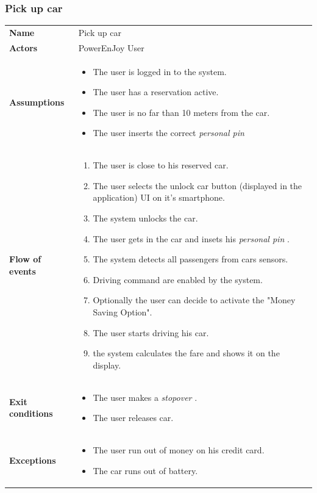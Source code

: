 \documentclass[english]{article}
\newcommand{\stopover}{\textit{stopover }}
\newcommand{\personalpin}{\textit{personal pin }}
\begin{document}
	\subsubsection{Pick up car}
	\begin{center}
	\begin{tabular}{l||p{10cm}}
	\textbf{Name} 
		& Pick up car\\ [8px]
	\textbf{Actors} 
		& PowerEnJoy User\\ [8px]
	\textbf{Assumptions} 
	& \begin{itemize}
		\item The user is logged in to the system.
		\item The user has a reservation active.
		\item The user is no far than 10 meters from the car.
		\item The user inserts the correct \personalpin 
	\end{itemize}\\
	\textbf{Flow of events}
		& \begin{enumerate}
 		\item The user is close to his reserved car.
 		\item The user selects the unlock car button (displayed in the application) UI on it's smartphone.
		\item The system unlocks the car.
		\item The user gets in the car and insets his \personalpin.
		\item The system detects all passengers from cars sensors.
		\item Driving command are enabled by the system. 
		\item Optionally the user can decide to activate the "Money Saving Option".
		\item The user starts driving his car.
		\item the system calculates the fare and shows it on the display.
		\end{enumerate}\\ 
	\textbf{Exit conditions}
		&\begin{itemize}
			\item The user makes a \stopover.
			\item The user releases car.
		\end{itemize}\\
	\textbf{Exceptions}
		& \begin{itemize}
			\item The user run out of money on his credit card.
			\item The car runs out of battery.
		\end{itemize}
	\end{tabular}
	\end{center}
	
\end{document}
